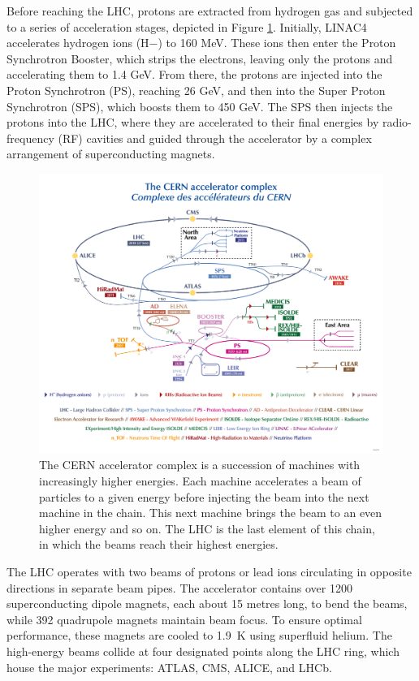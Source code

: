 Before reaching the LHC, protons are extracted from hydrogen gas and subjected to a series of acceleration stages, depicted in Figure \ref{fig:LHC_scheme}\cite{Lopienska:2800984}. Initially, LINAC4 accelerates hydrogen ions (H−) to 160 MeV. These ions then enter the Proton Synchrotron Booster, which strips the electrons, leaving only the protons and accelerating them to 1.4 GeV. From there, the protons are injected into the Proton Synchrotron (PS), reaching 26 GeV, and then into the Super Proton Synchrotron (SPS), which boosts them to 450 GeV. The SPS then injects the protons into the LHC, where they are accelerated to their final energies by radio-frequency (RF) cavities and guided through the accelerator by a complex arrangement of superconducting magnets.
\begin{figure}[ht]
    \centering
    \includegraphics[width=\textwidth]{figures/CCC-v2022-large.png}
    \caption{The CERN accelerator complex is a succession of machines with increasingly higher energies. Each machine accelerates a beam of particles to a given energy before injecting the beam into the next machine in the chain. This next machine brings the beam to an even higher energy and so on. The LHC is the last element of this chain, in which the beams reach their highest energies.}
    \label{fig:LHC_scheme}
\end{figure}
The LHC operates with two beams of protons or lead ions circulating in opposite directions in separate beam pipes. The accelerator contains over 1200 superconducting dipole magnets, each about 15 metres long, to bend the beams, while 392 quadrupole magnets maintain beam focus. To ensure optimal performance, these magnets are cooled to \SI{1.9}{\kelvin} using superfluid helium. The high-energy beams collide at four designated points along the LHC ring, which house the major experiments: ATLAS, CMS, ALICE, and LHCb.


